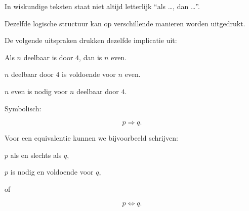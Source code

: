 \documentclass{ximera}
\begin{document}

In wiskundige teksten staat niet altijd letterlijk ``als \ldots, dan
\ldots''.

Dezelfde logische structuur kan op verschillende manieren worden
uitgedrukt.


\begin{voorbeeld}

De volgende uitspraken drukken dezelfde implicatie uit:

\begin{center}
Als $n$ deelbaar is door $4$, dan is $n$ even.
\end{center}

\begin{center}
$n$ deelbaar door $4$ is voldoende voor $n$ even.
\end{center}

\begin{center}
$n$ even is nodig voor $n$ deelbaar door $4$.
\end{center}

Symbolisch:

\[
p\Rightarrow q.
\]

\end{voorbeeld}


Voor een equivalentie kunnen we bijvoorbeeld schrijven:

\begin{center}
$p$ als en slechts als $q$,
\end{center}

\begin{center}
$p$ is nodig en voldoende voor $q$,
\end{center}

of

\[
p\Leftrightarrow q.
\]
\end{document}
